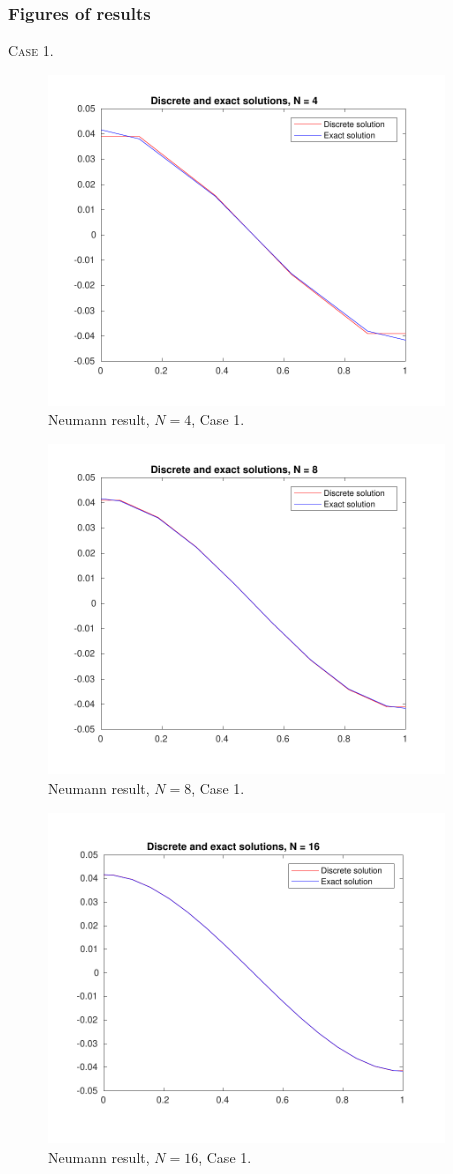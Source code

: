 \documentclass[a4paper]{article}
\numberwithin{equation}{section}
\begin{document}
\subsubsection{Figures of results}
\textsc{Case 1.}
\begin{figure}[H]
\centering\includegraphics[width=10.5cm]{fig_neumann_result_G1_CP1_I1_N4_M6_C1}
\caption{Neumann result, $N=4$, Case 1.}
\end{figure}
\begin{figure}[H]
\centering\includegraphics[width=10.5cm]{fig_neumann_result_G1_CP1_I1_N8_M6_C1}
\caption{Neumann result, $N=8$, Case 1.}
\end{figure}
\begin{figure}[H]
\centering\includegraphics[width=10.5cm]{fig_neumann_result_G1_CP1_I1_N16_M6_C1}
\caption{Neumann result, $N=16$, Case 1.}
\end{figure}
\end{document}
